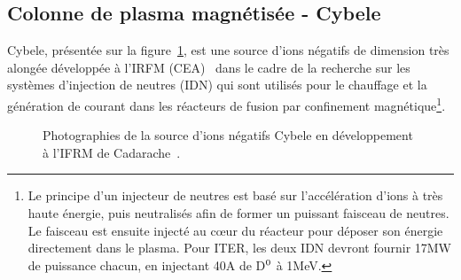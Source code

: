 \begin{refsection}
\section{Colonne de plasma magnétisée - Cybele}
Cybele, présentée sur la figure~\ref{4-cybelePhoto}, est une source d'ions
négatifs de dimension très alongée développée à
l'IRFM (CEA)~\cite{Simonin} dans le cadre de la recherche sur les systèmes
d'injection de neutres (IDN) qui sont utilisés pour le chauffage et la
génération de courant dans les réacteurs de fusion par confinement magnétique\footnote{Le principe d'un
injecteur de neutres est basé sur l'accélération d'ions à très haute énergie,
puis neutralisés afin de former un puissant faisceau de neutres.
Le faisceau est ensuite injecté au c\oe{}ur du réacteur pour déposer son énergie
directement dans le plasma. Pour ITER, les deux IDN devront fournir 17MW de
puissance chacun, en injectant 40A de D$^{{0}}$ à 1MeV.}.
\begin{figure}[htbp]
  \centering
    \caption{Photographies de la source d'ions négatifs Cybele en développement
    à l'IFRM de Cadarache~\parencite{SimoninHDR}.
    \label{4-cybelePhoto}} 
\end{figure}	


\end{refsection}
